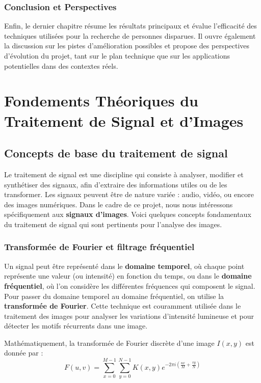 \documentclass[a4paper,12pt]{report}
\begin{document}
\subsection*{Conclusion et Perspectives}
Enfin, le dernier chapitre résume les résultats principaux et évalue l’efficacité des techniques utilisées pour la recherche de personnes disparues. Il ouvre également la discussion sur les pistes d'amélioration possibles et propose des perspectives d’évolution du projet, tant sur le plan technique que sur les applications potentielles dans des contextes réels.

\chapter{Fondements Théoriques du Traitement de Signal et d'Images}

\section{Concepts de base du traitement de signal}
Le traitement de signal est une discipline qui consiste à analyser, modifier et synthétiser des signaux, afin d'extraire des informations utiles ou de les transformer. Les signaux peuvent être de nature variée : audio, vidéo, ou encore des images numériques. Dans le cadre de ce projet, nous nous intéressons spécifiquement aux \textbf{signaux d’images}. Voici quelques concepts fondamentaux du traitement de signal qui sont pertinents pour l’analyse des images.

\subsection{Transformée de Fourier et filtrage fréquentiel}
Un signal peut être représenté dans le \textbf{domaine temporel}, où chaque point représente une valeur (ou intensité) en fonction du temps, ou dans le \textbf{domaine fréquentiel}, où l’on considère les différentes fréquences qui composent le signal. Pour passer du domaine temporel au domaine fréquentiel, on utilise la \textbf{transformée de Fourier}. Cette technique est couramment utilisée dans le traitement des images pour analyser les variations d'intensité lumineuse et pour détecter les motifs récurrents dans une image.

Mathématiquement, la transformée de Fourier discrète d'une image $I(x,y)$ est donnée par : 
\[F(u,v) = \sum_{x=0}^{M-1} \sum_{y=0}^{N-1} K(x,y) e^{-2\pi i \left( \frac{ux}{M} + \frac{vy}{N} \right)}\]
\end{document}
